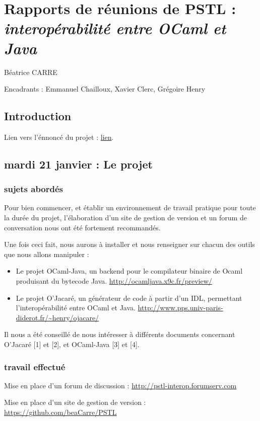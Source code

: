 \documentclass[a4paper, 11pt]{report}
\begin{document}
\chapter{Rapports de réunions de PSTL : \emph{interopérabilité entre OCaml et Java}}

Béatrice CARRE

Encadrants : Emmanuel Chailloux, Xavier Clerc, Grégoire Henry

\section*{Introduction}
Lien vers l'énnoncé du projet : 
\href{https://www-master.ufr-info-p6.jussieu.fr/2013/interoperabilite-entre-OCaml-et}{lien}.

\section{mardi 21 janvier : Le projet}
\subsection{sujets abordés}

Pour bien commencer, et établir un environnement de travail pratique
pour toute la durée du projet, l'élaboration d'un site de gestion de
version et un forum de conversation nous ont été fortement
recommandés.

Une fois ceci fait, nous aurons à installer et nous renseigner sur chacun des
outils que nous allons manipuler :
\begin{itemize}
\item Le projet OCaml-Java, un backend pour le compilateur binaire de Ocaml produisant du bytecode Java. \url{http://ocamljava.x9c.fr/preview/}
\item Le projet O'Jacaré, un générateur de code à partir d'un IDL, permettant l'interopérabilité entre OCaml et Java. \url{http://www.pps.univ-paris-diderot.fr/~henry/ojacare/}
\end{itemize}
Il nous a été conseillé de nous intéresser à différents documents
concernant O'Jacaré [1] et [2], et OCaml-Java [3] et [4].

\subsection{travail effectué}
Mise en place d'un forum de discussion :
\url{http://pstl-interop.forumserv.com}

Mise en place d'un site de gestion de version :
\url{https://github.com/beaCarre/PSTL}
\newline
\end{document}
